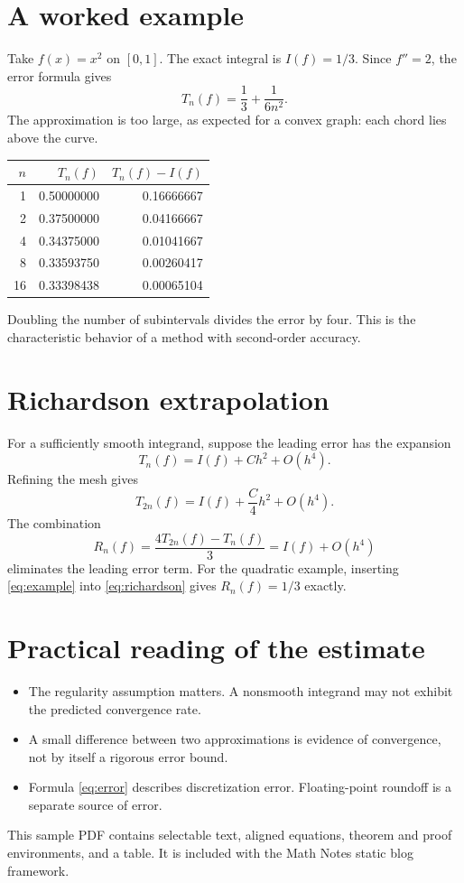 \documentclass[10pt,a4paper]{article}
\begin{document}
\newpage
\section{A worked example}
Take \(f(x)=x^2\) on \([0,1]\). The exact integral is \(I(f)=1/3\). Since \(f''=2\), the error formula gives
\begin{equation}
T_n(f)=\frac13+\frac{1}{6n^2}.
\label{eq:example}
\end{equation}
The approximation is too large, as expected for a convex graph: each chord lies above the curve.

\begin{center}
\begin{tabular}{rrr}
\toprule
\(n\) & \(T_n(f)\) & \(T_n(f)-I(f)\)\\
\midrule
1  & 0.50000000 & 0.16666667\\
2  & 0.37500000 & 0.04166667\\
4  & 0.34375000 & 0.01041667\\
8  & 0.33593750 & 0.00260417\\
16 & 0.33398438 & 0.00065104\\
\bottomrule
\end{tabular}
\end{center}

Doubling the number of subintervals divides the error by four. This is the characteristic behavior of a method with second-order accuracy.

\section{Richardson extrapolation}
For a sufficiently smooth integrand, suppose the leading error has the expansion
\[
T_n(f)=I(f)+Ch^2+O(h^4).
\]
Refining the mesh gives
\[
T_{2n}(f)=I(f)+\frac{C}{4}h^2+O(h^4).
\]
The combination
\begin{equation}
R_n(f)=\frac{4T_{2n}(f)-T_n(f)}{3}
=I(f)+O(h^4)
\label{eq:richardson}
\end{equation}
eliminates the leading error term. For the quadratic example, inserting \eqref{eq:example} into \eqref{eq:richardson} gives \(R_n(f)=1/3\) exactly.

\section{Practical reading of the estimate}
\begin{itemize}
\item The regularity assumption matters. A nonsmooth integrand may not exhibit the predicted convergence rate.
\item A small difference between two approximations is evidence of convergence, not by itself a rigorous error bound.
\item Formula \eqref{eq:error} describes discretization error. Floating-point roundoff is a separate source of error.
\end{itemize}

\vfill
{\small\color{muted}This sample PDF contains selectable text, aligned equations, theorem and proof environments, and a table. It is included with the Math Notes static blog framework.}
\end{document}
